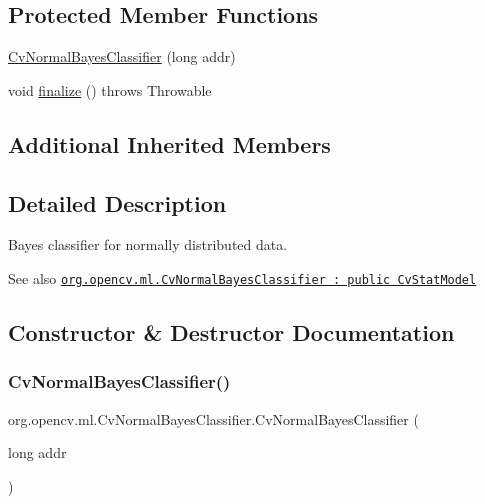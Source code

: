 \subsection*{Protected Member Functions}
\begin{DoxyCompactItemize}
\item 
\mbox{\hyperlink{classorg_1_1opencv_1_1ml_1_1_cv_normal_bayes_classifier_a70fa4bc248fba3e565c19518870eefbd}{Cv\+Normal\+Bayes\+Classifier}} (long addr)
\item 
void \mbox{\hyperlink{classorg_1_1opencv_1_1ml_1_1_cv_normal_bayes_classifier_a14105f5cb61fa92b6b3990690b16f247}{finalize}} ()  throws Throwable 
\end{DoxyCompactItemize}
\subsection*{Additional Inherited Members}


\subsection{Detailed Description}
Bayes classifier for normally distributed data.

\begin{DoxySeeAlso}{See also}
\href{http://docs.opencv.org/modules/ml/doc/normal_bayes_classifier.html#cvnormalbayesclassifier}{\tt org.\+opencv.\+ml.\+Cv\+Normal\+Bayes\+Classifier \+: public Cv\+Stat\+Model} 
\end{DoxySeeAlso}


\subsection{Constructor \& Destructor Documentation}
\mbox{\label{classorg_1_1opencv_1_1ml_1_1_cv_normal_bayes_classifier_a70fa4bc248fba3e565c19518870eefbd}} 
\subsubsection{\texorpdfstring{Cv\+Normal\+Bayes\+Classifier()}{CvNormalBayesClassifier()}\hspace{0.1cm}{\footnotesize\ttfamily [1/4]}}
{\footnotesize\ttfamily org.\+opencv.\+ml.\+Cv\+Normal\+Bayes\+Classifier.\+Cv\+Normal\+Bayes\+Classifier (\begin{DoxyParamCaption}\item[{long}]{addr }\end{DoxyParamCaption})\hspace{0.3cm}{\ttfamily [protected]}}

